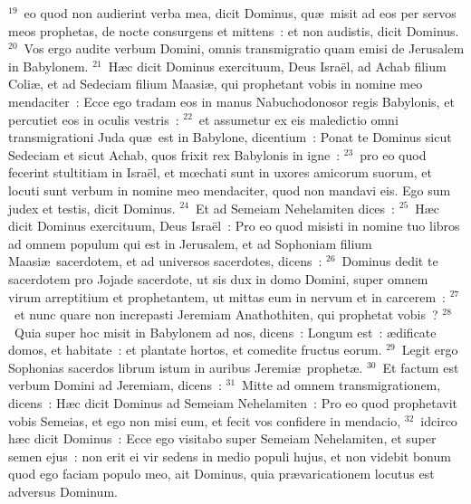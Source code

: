 ${}^{19}$~eo quod non audierint verba mea, dicit Dominus, qu\ae\ misit ad eos per servos meos prophetas, de nocte consurgens et mittens~: et non audistis, dicit Dominus.
${}^{20}$~Vos ergo audite verbum Domini, omnis transmigratio quam emisi de Jerusalem in Babylonem.
${}^{21}$~H\ae c dicit Dominus exercituum, Deus Isra\"el, ad Achab filium Coli\ae , et ad Sedeciam filium Maasi\ae , qui prophetant vobis in nomine meo mendaciter~: Ecce ego tradam eos in manus Nabuchodonosor regis Babylonis, et percutiet eos in oculis vestris~:
${}^{22}$~et assumetur ex eis maledictio omni transmigrationi Juda qu\ae\ est in Babylone, dicentium~: Ponat te Dominus sicut Sedeciam et sicut Achab, quos frixit rex Babylonis in igne~:
${}^{23}$~pro eo quod fecerint stultitiam in Isra\"el, et mœchati sunt in uxores amicorum suorum, et locuti sunt verbum in nomine meo mendaciter, quod non mandavi eis. Ego sum judex et testis, dicit Dominus.
${}^{24}$~Et ad Semeiam Nehelamiten dices~:
${}^{25}$~H\ae c dicit Dominus exercituum, Deus Isra\"el~: Pro eo quod misisti in nomine tuo libros ad omnem populum qui est in Jerusalem, et ad Sophoniam filium Maasi\ae\ sacerdotem, et ad universos sacerdotes, dicens~:
${}^{26}$~Dominus dedit te sacerdotem pro Jojade sacerdote, ut sis dux in domo Domini, super omnem virum arreptitium et prophetantem, ut mittas eum in nervum et in carcerem~:
${}^{27}$~et nunc quare non increpasti Jeremiam Anathothiten, qui prophetat vobis~?
${}^{28}$~Quia super hoc misit in Babylonem ad nos, dicens~: Longum est~: \ae dificate domos, et habitate~: et plantate hortos, et comedite fructus eorum.
${}^{29}$~Legit ergo Sophonias sacerdos librum istum in auribus Jeremi\ae\ prophet\ae .
${}^{30}$~Et factum est verbum Domini ad Jeremiam, dicens~:
${}^{31}$~Mitte ad omnem transmigrationem, dicens~: H\ae c dicit Dominus ad Semeiam Nehelamiten~: Pro eo quod prophetavit vobis Semeias, et ego non misi eum, et fecit vos confidere in mendacio,
${}^{32}$~idcirco h\ae c dicit Dominus~: Ecce ego visitabo super Semeiam Nehelamiten, et super semen ejus~: non erit ei vir sedens in medio populi hujus, et non videbit bonum quod ego faciam populo meo, ait Dominus, quia pr\ae varicationem locutus est adversus Dominum.

